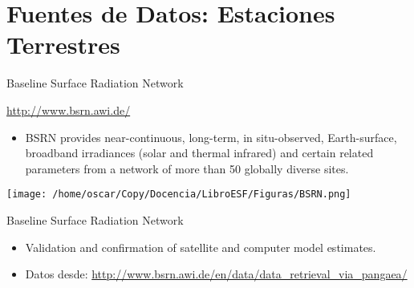 \documentclass[xcolor={usenames,svgnames,dvipsnames}]{beamer}
\begin{document}
\section{Fuentes de Datos: Estaciones Terrestres}
\label{sec-4}

\begin{frame}[label=sec-4-1]{Baseline Surface Radiation Network}
\begin{block}{\url{http://www.bsrn.awi.de/}}
\begin{itemize}
\item BSRN provides near-continuous, long-term, in situ-observed,
Earth-surface, broadband irradiances (solar and thermal infrared)
and certain related parameters from a network of more than 50
globally diverse sites.
\end{itemize}

\begin{center}
\texttt{[image: /home/oscar/Copy/Docencia/LibroESF/Figuras/BSRN.png]}
\end{center}
\end{block}
\end{frame}
\begin{frame}[label=sec-4-2]{Baseline Surface Radiation Network}
\begin{itemize}
\item Validation and confirmation of satellite and computer model
estimates.

\item Datos desde:  \url{http://www.bsrn.awi.de/en/data/data_retrieval_via_pangaea/}
\end{itemize}
\end{frame}
\end{document}
